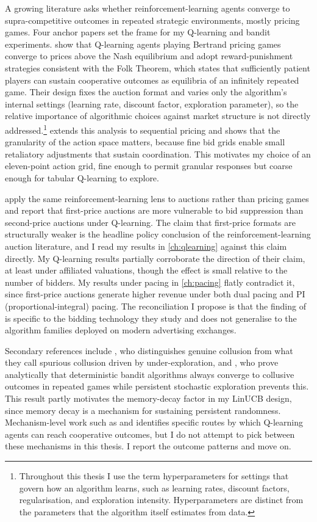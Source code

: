 A growing literature asks whether reinforcement-learning agents converge to supra-competitive outcomes in repeated strategic environments, mostly pricing games. Four anchor papers set the frame for my Q-learning and bandit experiments. \citet{Calvano2020} show that Q-learning agents playing Bertrand pricing games converge to prices above the Nash equilibrium and adopt reward-punishment strategies consistent with the Folk Theorem, which states that sufficiently patient players can sustain cooperative outcomes as equilibria of an infinitely repeated game. Their design fixes the auction format and varies only the algorithm's internal settings (learning rate, discount factor, exploration parameter), so the relative importance of algorithmic choices against market structure is not directly addressed.\footnote{Throughout this thesis I use the term hyperparameters for settings that govern how an algorithm learns, such as learning rates, discount factors, regularisation, and exploration intensity. Hyperparameters are distinct from the parameters that the algorithm itself estimates from data.} \citet{Klein2021} extends this analysis to sequential pricing and shows that the granularity of the action space matters, because fine bid grids enable small retaliatory adjustments that sustain coordination. This motivates my choice of an eleven-point action grid, fine enough to permit granular responses but coarse enough for tabular Q-learning to explore.

\citet{BanchioSkrzypacz2022} apply the same reinforcement-learning lens to auctions rather than pricing games and report that first-price auctions are more vulnerable to bid suppression than second-price auctions under Q-learning. The claim that first-price formats are structurally weaker is the headline policy conclusion of the reinforcement-learning auction literature, and I read my results in \cref{ch:qlearning} against this claim directly. My Q-learning results partially corroborate the direction of their claim, at least under affiliated valuations, though the effect is small relative to the number of bidders. My results under pacing in \cref{ch:pacing} flatly contradict it, since first-price auctions generate higher revenue under both dual pacing and PI (proportional-integral) pacing. The reconciliation I propose is that the finding of \citet{BanchioSkrzypacz2022} is specific to the bidding technology they study and does not generalise to the algorithm families deployed on modern advertising exchanges.

Secondary references include \citet{Calvano2023}, who distinguishes genuine collusion from what they call spurious collusion driven by under-exploration, and \citet{Douglas2024}, who prove analytically that deterministic bandit algorithms always converge to collusive outcomes in repeated games while persistent stochastic exploration prevents this. This result partly motivates the memory-decay factor in my LinUCB design, since memory decay is a mechanism for sustaining persistent randomness. Mechanism-level work such as \citet{BanchioMantegazza2022} and \citet{Bertrand2025} identifies specific routes by which Q-learning agents can reach cooperative outcomes, but I do not attempt to pick between these mechanisms in this thesis. I report the outcome patterns and move on.

